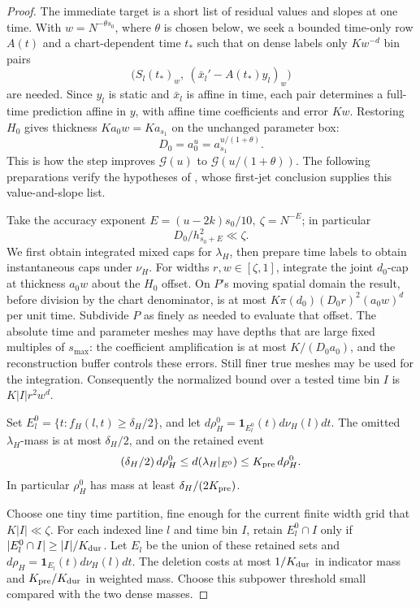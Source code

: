\begin{proof}
The immediate target is a short list of residual values and slopes
at one time. With \(w=N^{-\theta s_0}\), where \(\theta\) is
chosen below, we seek a bounded time-only row \(A(t)\) and a
chart-dependent time \(t_*\) such that on dense labels only
\(Kw^{-d}\) bin pairs
\[
 \bigl(S_l(t_*)_w,\ (\bar x_l'-A(t_*)y_l)_w\bigr)
\]
are needed. Since \(y_l\) is static and \(\bar x_l\) is
affine in time, each pair determines a full-time prediction affine
in \(y\), with affine time coefficients and error \(Kw\).
Restoring \(H_0\) gives
thickness \(Ka_0w=Ka_{s_1}\) on the unchanged parameter box:
\[
 D_0=a_0^u=a_{s_1}^{u/(1+\theta)}.
\]
This is how the step improves \(\mathcal G(u)\) to
\(\mathcal G(u/(1+\theta))\). The following preparations verify
the hypotheses of , whose first-jet
conclusion supplies this value-and-slope list.

Take the accuracy exponent \(E=(u-2k)s_0/10,\ \zeta=N^{-E}\); in particular
\[
 D_0/h_{s_0+E}^2\ll\zeta.
\]
We first obtain integrated mixed caps for \(\lambda_H\), then
prepare time labels to obtain instantaneous caps under \(\nu_H\).
For widths \(r,w\in[\zeta,1]\), integrate the joint \(d_0\)-cap
at thickness \(a_0w\) about the \(H_0\) offset. On \(P\)'s
moving spatial domain the result, before division by the chart
denominator, is at most
\(K\pi(d_0)(D_0r)^2(a_0w)^d\) per unit time.
Subdivide \(P\) as finely as needed to evaluate that offset. The
absolute time and parameter meshes may have depths that are large
fixed multiples of \(s_{\max}\): the coefficient amplification
is at most \(K/(D_0a_0)\), and the reconstruction buffer controls
these errors. Still finer true meshes may be used for the
integration. Consequently the normalized bound over a tested time
bin \(I\) is \(K|I|r^2w^d\).

Set \(E_l^0=\{t:f_H(l,t)\ge\delta_H/2\}\), and let
\(d\rho_H^0=\mathbf1_{E_l^0}(t)d\nu_H(l)dt\). The omitted
\(\lambda_H\)-mass is at most \(\delta_H/2\), and on the
retained event
\[
 (\delta_H/2)\,d\rho_H^0
 \le d(\lambda_H|_{E^0})\le K_{\rm pre}\,d\rho_H^0.
\]
In particular \(\rho_H^0\) has mass at least
\(\delta_H/(2K_{\rm pre})\).

Choose one tiny time partition, fine enough for the current finite
width grid that \(K|I|\ll\zeta\). For each indexed line \(l\)
and time bin \(I\), retain \(E_l^0\cap I\) only if
\(|E_l^0\cap I|\ge |I|/K_{\rm dur}\). Let \(E_l\) be the
union of these retained sets and
\(d\rho_H=\mathbf1_{E_l}(t)d\nu_H(l)dt\). The deletion costs
at most \(1/K_{\rm dur}\) in indicator mass and
\(K_{\rm pre}/K_{\rm dur}\) in weighted mass. Choose this
subpower threshold small compared with the two dense masses.


\end{proof}
